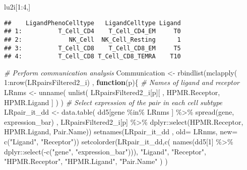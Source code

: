 \documentclass[
]{article}
\newenvironment{Shaded}{\begin{snugshade}}{\end{snugshade}}
\newcommand{\AttributeTok}[1]{\textcolor[rgb]{0.77,0.63,0.00}{#1}}
\newcommand{\CommentTok}[1]{\textcolor[rgb]{0.56,0.35,0.01}{\textit{#1}}}
\newcommand{\ControlFlowTok}[1]{\textcolor[rgb]{0.13,0.29,0.53}{\textbf{#1}}}
\newcommand{\DecValTok}[1]{\textcolor[rgb]{0.00,0.00,0.81}{#1}}
\newcommand{\FunctionTok}[1]{\textcolor[rgb]{0.00,0.00,0.00}{#1}}
\newcommand{\NormalTok}[1]{#1}
\newcommand{\OtherTok}[1]{\textcolor[rgb]{0.56,0.35,0.01}{#1}}
\newcommand{\SpecialCharTok}[1]{\textcolor[rgb]{0.00,0.00,0.00}{#1}}
\newcommand{\StringTok}[1]{\textcolor[rgb]{0.31,0.60,0.02}{#1}}
\begin{document}
\begin{Shaded}
\begin{Highlighting}[]
\NormalTok{lu2i[}\DecValTok{1}\SpecialCharTok{:}\DecValTok{4}\NormalTok{,]}
\end{Highlighting}
\end{Shaded}

\begin{verbatim}
##    LigandPhenoCelltype   LigandCelltype Ligand
## 1:          T_Cell_CD4    T_Cell_CD4_EM     T0
## 2:             NK_Cell  NK_Cell_Resting      1
## 3:          T_Cell_CD8    T_Cell_CD8_EM     T5
## 4:          T_Cell_CD8 T_Cell_CD8_TEMRA    T10
\end{verbatim}

\begin{Shaded}
\begin{Highlighting}[]
\CommentTok{\# Perform communication analysis}
\NormalTok{Communication }\OtherTok{\textless{}{-}} \FunctionTok{rbindlist}\NormalTok{(}\FunctionTok{mclapply}\NormalTok{( }\DecValTok{1}\SpecialCharTok{:}\FunctionTok{nrow}\NormalTok{(LRpairsFiltered2\_i)   , }\ControlFlowTok{function}\NormalTok{(p)\{   }
  \CommentTok{\# Names of ligand and receptor}
\NormalTok{  LRnms }\OtherTok{\textless{}{-}} \FunctionTok{unname}\NormalTok{( }\FunctionTok{unlist}\NormalTok{( LRpairsFiltered2\_i[p][ , HPMR.Receptor, HPMR.Ligand ] ) )}
  \CommentTok{\# Select expression of the pair in each cell subtype}
\NormalTok{  LRpair\_it\_dd }\OtherTok{\textless{}{-}}  \FunctionTok{data.table}\NormalTok{( dd5[gene }\SpecialCharTok{\%in\%}\NormalTok{ LRnms ] }\SpecialCharTok{\%\textgreater{}\%} \FunctionTok{spread}\NormalTok{(gene, expression\_bar) ,  LRpairsFiltered2\_i[p] }\SpecialCharTok{\%\textgreater{}\%}\NormalTok{ dplyr}\SpecialCharTok{::}\FunctionTok{select}\NormalTok{(HPMR.Receptor, HPMR.Ligand, Pair.Name))}
  \FunctionTok{setnames}\NormalTok{(LRpair\_it\_dd , }\AttributeTok{old=}\NormalTok{ LRnms, }\AttributeTok{new=} \FunctionTok{c}\NormalTok{(}\StringTok{"Ligand"}\NormalTok{, }\StringTok{"Receptor"}\NormalTok{))}
  \FunctionTok{setcolorder}\NormalTok{(LRpair\_it\_dd,}\FunctionTok{c}\NormalTok{( }\FunctionTok{names}\NormalTok{(dd5[}\DecValTok{1}\NormalTok{] }\SpecialCharTok{\%\textgreater{}\%}\NormalTok{ dplyr}\SpecialCharTok{::}\FunctionTok{select}\NormalTok{(}\SpecialCharTok{{-}}\FunctionTok{c}\NormalTok{(}\StringTok{"gene"}\NormalTok{, }\StringTok{"expression\_bar"}\NormalTok{))), }\StringTok{"Ligand"}\NormalTok{, }\StringTok{"Receptor"}\NormalTok{, }\StringTok{"HPMR.Receptor"}\NormalTok{, }\StringTok{"HPMR.Ligand"}\NormalTok{, }\StringTok{"Pair.Name"}\NormalTok{ )  )}
  

\end{Highlighting}
\end{Shaded}
\end{document}
